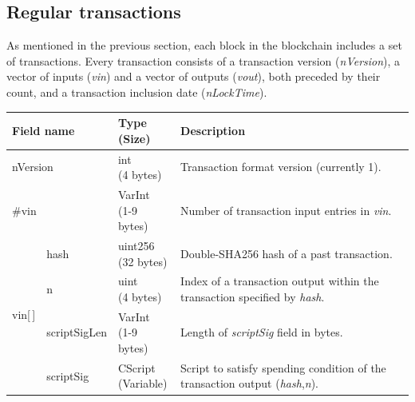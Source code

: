 \subsection*{Regular transactions} \label{sec:RegularTransactions}
As mentioned in the previous section, each block in the blockchain includes a set of transactions. Every transaction consists of a transaction version (\textit{nVersion}), a vector of inputs (\textit{vin}) and a vector of outputs (\textit{vout}), both preceded by their count, and a transaction inclusion date (\textit{nLockTime}).
\begin{table}[ht!]
	\begin{tabularx}{\textwidth}{ | m{25pt} | m{70pt} | >{\centering} m{60pt} | X |} \hline
		\multicolumn{2}{|l|}{\textbf{Field name}} &
		\bigcell{c}{\textbf{Type} \\ \textbf{(Size)}} &
		\textbf{Description}\\ \hline\hline
    	
    	\multicolumn{2}{|l|}{nVersion} &
    	\bigcell{c}{int \\ (4 bytes)} &
    	Transaction format version (currently 1).\\ \hline
    	
	    \multicolumn{2}{|l|}{\#vin} &
	    \bigcell{c}{VarInt \\ (1-9 bytes)} &
    	Number of transaction input entries in \textit{vin}. \\ \hline
    	
		\multirow{9}{25pt}{\centering vin[\,]} &
		
		hash &
		\bigcell{c}{uint256 \\ (32 bytes)} &
		Double-SHA256 hash of a past transaction.\\ \cline{2-4}
		
		& n &
		\bigcell{c}{uint \\ (4 bytes)} &
		Index of a transaction output within the transaction specified by \textit{hash}. \\ \cline{2-4}

		& scriptSigLen &
		\bigcell{c}{VarInt \\ (1-9 bytes)} &
		Length of \textit{scriptSig} field in bytes. \\ \cline{2-4}
				
		& scriptSig &
		\bigcell{c}{CScript \\ (Variable)} &
		Script to satisfy spending condition of the transaction output (\textit{hash},\textit{n}). \\ \cline{2-4}
		

\end{tabularx}
\end{table}
